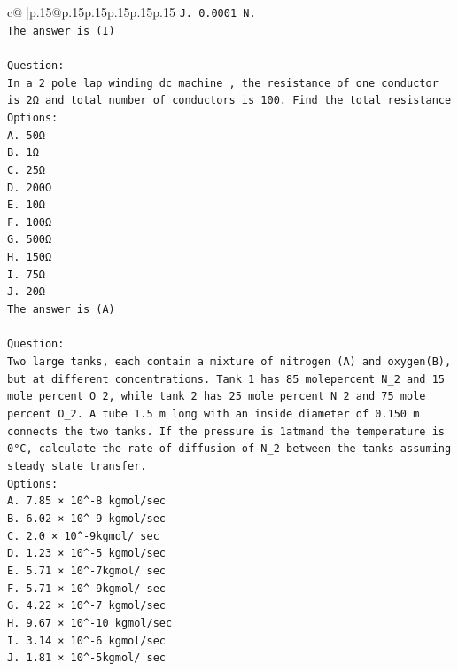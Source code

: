 \documentclass{article}
\begin{document}
{\begin{supertabular}{c@{$\;$}|p{.15\linewidth}@{}p{.15\linewidth}p{.15\linewidth}p{.15\linewidth}p{.15\linewidth}p{.15\linewidth}}
{{{\texttt{J. 0.0001 N.} \\
\texttt{The answer is (I)} \\
\\ 
\texttt{Question:} \\
\texttt{In a 2 pole lap winding dc machine , the resistance of one conductor is 2Ω and total number of conductors is 100. Find the total resistance} \\
\texttt{Options:} \\
\texttt{A. 50Ω} \\
\texttt{B. 1Ω} \\
\texttt{C. 25Ω} \\
\texttt{D. 200Ω} \\
\texttt{E. 10Ω} \\
\texttt{F. 100Ω} \\
\texttt{G. 500Ω} \\
\texttt{H. 150Ω} \\
\texttt{I. 75Ω} \\
\texttt{J. 20Ω} \\
\texttt{The answer is (A)} \\
\\ 
\texttt{Question:} \\
\texttt{Two large tanks, each contain a mixture of nitrogen (A) and oxygen(B), but at different concentrations. Tank 1 has 85 molepercent N\_2 and 15 mole percent O\_2, while tank 2 has 25 mole percent N\_2 and 75 mole percent O\_2. A tube 1.5 m long with an inside diameter of 0.150 m connects the two tanks. If the pressure is 1atmand the temperature is 0°C, calculate the rate of diffusion of N\_2 between the tanks assuming steady state transfer.} \\
\texttt{Options:} \\
\texttt{A. 7.85 × 10\^{}{-}8 kgmol/sec} \\
\texttt{B. 6.02 × 10\^{}{-}9 kgmol/sec} \\
\texttt{C. 2.0 × 10\^{}{-}9kgmol/ sec} \\
\texttt{D. 1.23 × 10\^{}{-}5 kgmol/sec} \\
\texttt{E. 5.71 × 10\^{}{-}7kgmol/ sec} \\
\texttt{F. 5.71 × 10\^{}{-}9kgmol/ sec} \\
\texttt{G. 4.22 × 10\^{}{-}7 kgmol/sec} \\
\texttt{H. 9.67 × 10\^{}{-}10 kgmol/sec} \\
\texttt{I. 3.14 × 10\^{}{-}6 kgmol/sec} \\
\texttt{J. 1.81 × 10\^{}{-}5kgmol/ sec} \\
            }
        }
    }
     \\ \\


\end{supertabular}}
\end{document}
